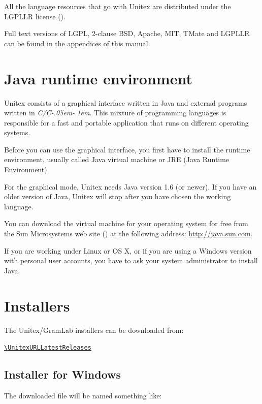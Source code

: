 \bigskip
\noindent All the language resources that go with Unitex are distributed under the LGPLLR
license  (\cite{LGPLLR}).

\bigskip
\noindent Full text versions of LGPL, 2-clause BSD, Apache, MIT, TMate and LGPLLR can be found in
the appendices of this manual.

\section{Java runtime environment}
Unitex consists of a graphical interface written in Java and external programs
written in \textit{C/C\kern-.05em\raisebox{.5ex}{++}\kern-.1em}. This mixture of
programming languages is responsible for a fast and portable application that
runs on different operating systems.

\bigskip
\noindent Before you can use the graphical interface, you first have to install the runtime
environment, usually called Java virtual machine  or
JRE (Java Runtime Environment).

\bigskip
\noindent For the graphical mode, Unitex needs Java version 1.6 (or newer). If you have an
older version of Java, Unitex will stop after you have chosen the working language.

\bigskip
\noindent You can download the virtual machine for your operating system for free from the
Sun Microsystems web site (\cite{site-java}) at the following address:
\url{http://java.sun.com}.

\bigskip
\noindent If you are working under Linux or OS X, or if you are using a Windows version
with personal user accounts, you have to ask your system administrator to install Java.

\section{Installers}
\begin{samepage}
The Unitex/GramLab installers can be downloaded from:

\begin{center}
{\tt\url{\UnitexURLLatestReleases}}
\end{center}
\end{samepage}

\subsection{Installer for Windows}
The downloaded file will be named something like:

